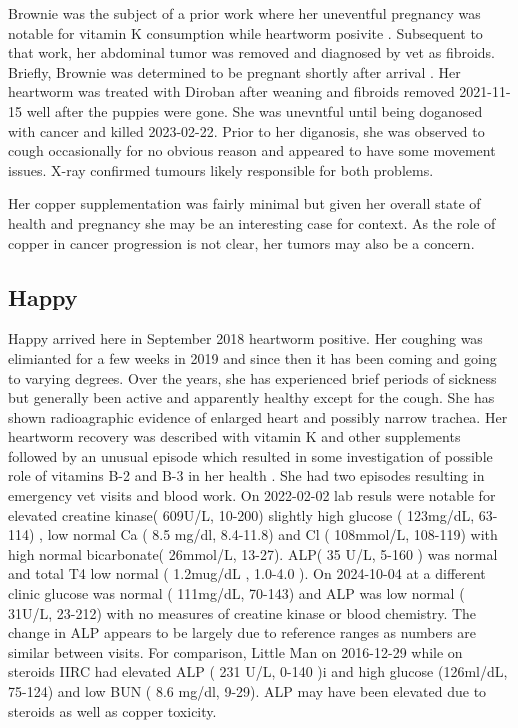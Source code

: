 \mjmbrowniecu

Brownie was the subject of a prior work 
where her uneventful pregnancy was notable
for vitamin K consumption while heartworm posivite
\cite{mmarchywka-MJM-2021-003-v0.50rg}. 
Subsequent to that work, her abdominal tumor
was removed and diagnosed  by vet as fibroids. 
Briefly, 
Brownie was determined to be pregnant shortly after arrival
. Her  heartworm
was  treated with Diroban after weaning  and fibroids
removed 2021-11-15 well after the puppies were gone. She was
unevntful until being doganosed with cancer and killed
2023-02-22. Prior to her diganosis, she was observed to 
cough occasionally for no obvious reason and appeared to
have some movement issues. X-ray confirmed tumours likely
responsible for both problems.   

Her copper supplementation was fairly minimal but given her
overall state of health and pregnancy she may be
an interesting case for context.  As the role of copper in cancer
progression is not clear, her tumors  may also be a concern. 


\subsection{Happy}

\mjmhappycu

Happy arrived here in September 2018 heartworm positive.
Her coughing was elimianted for a few weeks in 2019 and
since then it has been coming and going to varying degrees.
Over the years, she has experienced brief periods of sickness
but generally been active and apparently healthy except for the cough.
She has shown  radioagraphic evidence of enlarged heart and possibly narrow
trachea.   
Her heartworm recovery was described
with vitamin K and other supplements
\cite{mmarchywka-MJM-2019-001-.1li}
followed by an unusual episode which resulted in some
investigation of possible role of vitamins B-2 and B-3
in her health
\cite{marchywka-MJM-2022-009-0.50rg}
.
She had two episodes resulting in emergency vet visits
and blood work. On 2022-02-02 lab resuls were notable for
elevated creatine kinase( 609U/L, 10-200) 
slightly high glucose ( 123mg/dL, 63-114) , low normal Ca
( 8.5 mg/dl, 8.4-11.8)  and Cl ( 108mmol/L, 108-119)
with high normal bicarbonate( 26mmol/L, 13-27). 
ALP( 35 U/L, 5-160 ) was normal
and total T4 low normal ( 1.2mug/dL , 1.0-4.0 ). 
On 2024-10-04 at a different clinic glucose was normal
( 111mg/dL, 70-143) and ALP was low normal ( 31U/L, 23-212)
with no measures of creatine kinase or blood chemistry.
The change in ALP appears to be largely due to reference ranges
as numbers are similar between visits. 
For comparison, Little Man on 2016-12-29 while on steroids
IIRC had elevated ALP ( 231 U/L, 0-140 )i and high
glucose (126ml/dL, 75-124) and low BUN ( 8.6 mg/dl, 9-29).
ALP may have been elevated due to steroids as well as copper
toxicity. 

